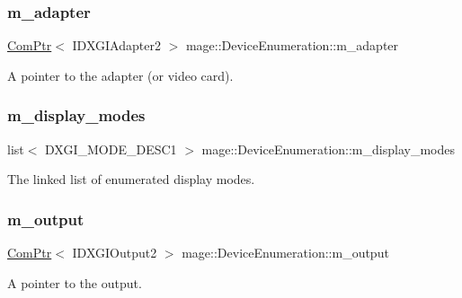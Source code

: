 \subsubsection{\texorpdfstring{m\+\_\+adapter}{m\_adapter}}
{\footnotesize\ttfamily \hyperlink{namespacemage_ae74f374780900893caa5555d1031fd79}{Com\+Ptr}$<$ I\+D\+X\+G\+I\+Adapter2 $>$ mage\+::\+Device\+Enumeration\+::m\+\_\+adapter\hspace{0.3cm}{\ttfamily [protected]}}

A pointer to the adapter (or video card). \hypertarget{classmage_1_1_device_enumeration_aae356ac476a35ce4074f61cfd75ecdbe}{}\label{classmage_1_1_device_enumeration_aae356ac476a35ce4074f61cfd75ecdbe} 
\subsubsection{\texorpdfstring{m\+\_\+display\+\_\+modes}{m\_display\_modes}}
{\footnotesize\ttfamily list$<$ D\+X\+G\+I\+\_\+\+M\+O\+D\+E\+\_\+\+D\+E\+S\+C1 $>$ mage\+::\+Device\+Enumeration\+::m\+\_\+display\+\_\+modes\hspace{0.3cm}{\ttfamily [protected]}}

The linked list of enumerated display modes. \hypertarget{classmage_1_1_device_enumeration_a49580b67748053ed6172d6458b5083ca}{}\label{classmage_1_1_device_enumeration_a49580b67748053ed6172d6458b5083ca} 
\subsubsection{\texorpdfstring{m\+\_\+output}{m\_output}}
{\footnotesize\ttfamily \hyperlink{namespacemage_ae74f374780900893caa5555d1031fd79}{Com\+Ptr}$<$ I\+D\+X\+G\+I\+Output2 $>$ mage\+::\+Device\+Enumeration\+::m\+\_\+output\hspace{0.3cm}{\ttfamily [protected]}}

A pointer to the output. \hypertarget{classmage_1_1_device_enumeration_a74b32839bda6446db56aaf4b6dd25f20}{}\label{classmage_1_1_device_enumeration_a74b32839bda6446db56aaf4b6dd25f20} 
